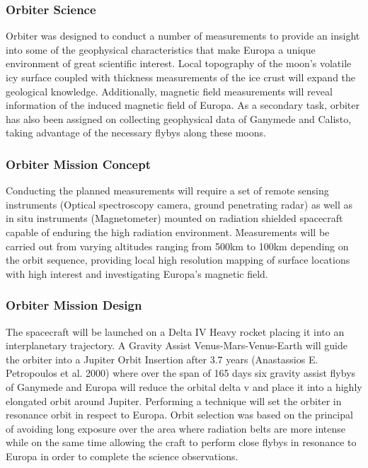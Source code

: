 \subsubsection{Orbiter Science}
Orbiter was designed to conduct a number of measurements to provide an insight into some of the geophysical characteristics that make Europa a unique environment of great scientific interest. Local topography of the moon’s volatile icy surface coupled with thickness measurements of the ice crust will expand the geological knowledge. Additionally, magnetic field measurements will reveal information of the induced magnetic field of Europa. As a secondary task, orbiter has also been assigned on collecting geophysical data of Ganymede and Calisto, taking advantage of the necessary flybys along these moons.

\subsubsection{Orbiter Mission Concept}
Conducting the planned measurements will require a set of remote sensing instruments (Optical spectroscopy camera, ground penetrating radar) as well as in situ instruments (Magnetometer) mounted on radiation shielded spacecraft capable of enduring the high radiation environment. Measurements will be carried out from varying altitudes ranging from 500km to 100km depending on the orbit sequence, providing local high resolution mapping of surface locations with high interest and investigating Europa’s magnetic field. 

\subsubsection{Orbiter Mission Design}
The spacecraft will be launched on a Delta IV Heavy rocket placing it into an interplanetary trajectory. A Gravity Assist Venus-Mars-Venus-Earth will guide the orbiter into a Jupiter Orbit Insertion after 3.7 years (Anastassios E. Petropoulos et al. 2000) where over the span of 165 days six gravity assist flybys of Ganymede and Europa will reduce the orbital delta v and place it into a highly elongated orbit around Jupiter. Performing a technique will set the orbiter in resonance orbit in respect to Europa. Orbit selection was based on the principal of avoiding long exposure over the area where radiation belts are more intense while on the same time allowing the craft to perform close flybys in resonance to Europa in order to complete the science observations.

